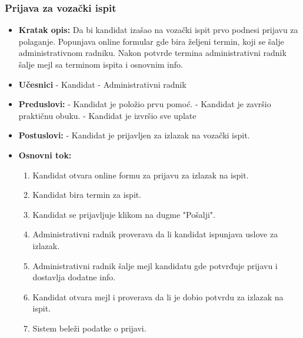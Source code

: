 \subsubsection{Prijava za vozački ispit}

\vspace{3mm}

\begin{itemize}

\item \textbf{Kratak opis:} Da bi kandidat izašao na vozački ispit prvo podnesi prijavu za polaganje. Popunjava online formular gde bira željeni termin, koji se  šalje administrativnom radniku. Nakon potvrde termina administrativni radnik šalje mejl sa terminom ispita i osnovnim info.

\vspace{2mm}

\item \textbf{Učesnici} \newline
   - Kandidat \newline   
   - Administrativni radnik 
   
\item \textbf{Preduslovi:} \newline
   - Kandidat je položio prvu pomoć. \newline
   - Kandidat je završio praktičnu obuku. \newline
   - Kandidat je izvršio sve uplate

\item \textbf{Postuslovi:} \newline
    - Kandidat je prijavljen za izlazak na vozački ispit.

\item \textbf{Osnovni tok:}  
   \begin{enumerate}
   \item Kandidat otvara online formu za prijavu za izlazak na ispit.
   \item Kandidat bira termin za ispit.
   \item Kandidat se prijavljuje klikom na dugme "Pošalji".
   \item Administrativni radnik proverava da li kandidat ispunjava uslove za izlazak.
   \item Administrativni radnik šalje mejl kandidatu gde potvrđuje prijavu i dostavlja dodatne info.
   \item Kandidat otvara mejl i proverava da li je dobio potvrdu za izlazak na ispit. 
   \item Sistem beleži podatke o prijavi. 
   \end{enumerate}


\end{itemize}
